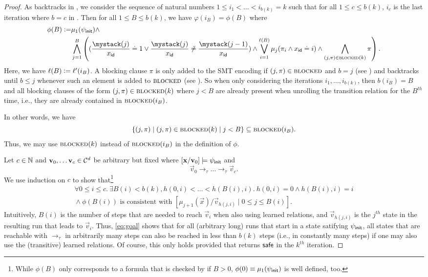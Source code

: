 {\begin{proof}
    As  backtracks in , we consider the sequence of natural numbers $1 \leq i_1 < \ldots < i_{b(k)} = k$ such that for all $1 \leq c \leq b(k)$, $i_c$ is the last iteration where $b=c$ in .
    Then for all $1 \leq B \leq b(k)$, we have $\varphi(i_B) = \phi(B)$ where
    \begin{align*}
      \phi(B) \Def & \mu_{1}(\psi_\init) \land \\
                   & \bigwedge_{j=1}^{B}
      \left( (\ind[\id]{x}{j} \doteq 1 \lor \ind[\id]{x}{j} \not\doteq \ind[\id]{x}{j-1}) \land \bigvee_{i=1}^{\ell(B)}\mu_{j}(\pi_i \land x_{\id} \doteq i) \land \bigwedge_{(j,\pi) \in \blocked(k)} \pi \right).
    \end{align*}
    Here, we have $\ell(B) \mathrel{\mathop:}= \ell'(i_B)$.
    A blocking clause $\pi$ is only added to the SMT encoding if $(j,\pi) \in \textsc{blocked}$ and $b=j$ (see ) and  backtracks until $b \leq j$ whenever such an element is added to $\textsc{blocked}$ (see ).
    So when only considering the iterations $i_1, \ldots, i_{b(k)}$, then $b(i_B) = B$ and all blocking clauses of the form $(j,\pi) \in \textsc{blocked}(k)$ where $j < B$ are already present when unrolling the transition relation for the $B^{th}$ time, i.e., they are already contained in $\textsc{blocked}(i_B)$.

    In other words, we have
    \[
      \{(j,\pi) \mid (j,\pi) \in \textsc{blocked}(k) \mid j < B\} \subseteq \textsc{blocked}(i_B).
    \]
    Thus, we may use $\textsc{blocked}(k)$ instead of $\textsc{blocked}(i_B)$ in the definition of
    $\phi$.

    Let $c \in \mathbb{N}$ and $\bm{\mathrm{v}}_0,\ldots\bm{\mathrm{v}}_c \in \mathcal{C}^d$ be arbitrary but fixed where $[\bm{\mathrm{x}}/\bm{\mathrm{v}}_0] \models \psi_{\mathsf{init}}$ and
    \[
      \vec{v}_0 \to_{\tau} \ldots \to_{\tau} \vec{v}_c.
    \]
    We use induction on $c$ to show that\footnote{While $\phi(B)$ only corresponds to a formula that is checked by  if $B > 0$, $\phi(0) \equiv \mu_1(\psi_\init)$ is well defined, too.}
    \begin{multline}
      \label{eq:goal}
      \forall 0 \leq i \leq c.\ \exists B(i) < b(k), h(0,i) < \ldots < h(B(i),i).\ h(0,i) = 0 \land h(B(i),i) = i\\
      {} \land \phi(B(i)) \text{ is consistent with } [\mu_{j+1}(\vec{x})/\vec{v}_{h(j,i)} \mid 0 \leq j \leq B(i)].
    \end{multline}
    Intuitively, $B(i)$ is the number of steps that are needed to reach $\vec{v}_i$ when also using learned relations, and $\vec{v}_{h(j,i)}$ is the $j^{th}$ state in the resulting run that leads to $\vec{v}_i$.
    Thus, \eqref{eq:goal} shows that for all (arbitrary long) runs that start in a state satifying $\psi_{\mathsf{init}}$, all states that are reachable with $\to_\tau$ in arbitrarily many steps can also be reached in less than $b(k)$ steps (i.e., in constantly many steps) if one may also use the (transitive) learned relations.
    Of course, this only holds provided that  returns $\mathsf{safe}$ in the $k^{th}$ iteration.


\end{proof}}
